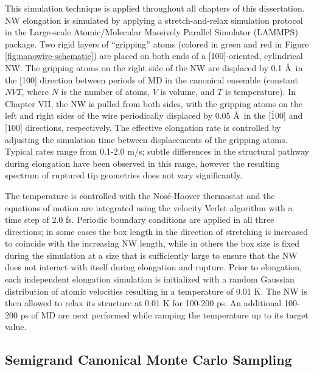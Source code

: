\documentclass[10pt]{report}  %
\newcommand\findent{\hspace*{\parindent}}
\begin{document}
\findent This simulation technique is applied throughout all chapters of this dissertation. NW elongation is simulated by applying a stretch-and-relax simulation protocol \cite{Pu_JCP:2007,Pu:2007,Pu:2008,Pu:2010} in the Large-scale Atomic/Molecular Massively Parallel Simulator (LAMMPS) \cite{Plimpton:1995} package. Two rigid layers of ``gripping'' atoms (colored in green and red in Figure \ref{fig:nanowire-schematic}) are placed on both ends of a [100]-oriented, cylindrical NW. The gripping atoms on the right side of the NW are displaced by 0.1 \AA\ in the [100] direction between periods of MD in the canonical ensemble (constant $NVT$, where $N$ is the number of atoms, $V$ is volume, and $T$ is temperature). In Chapter VII, the NW is pulled from both sides, with the gripping atoms on the left and right sides of the wire periodically displaced by 0.05 \AA\ in the [$\bar{1}$00] and [100] directions, respectively. The effective elongation rate is controlled by adjusting the simulation time between displacements of the gripping atoms. Typical rates range from 0.1-2.0 m/s; subtle differences in the structural pathway during elongation have been observed in this range, however the resulting spectrum of ruptured tip geometries does not vary significantly. \cite{Iacovella_scidac:2011}



The temperature is controlled with the Nos\'{e}-Hoover thermostat \cite{Hoover:1985,Nose:1984} and the equations of motion are integrated using the velocity Verlet algorithm with a time step of 2.0 fs. Periodic boundary conditions are applied in all three directions; in some cases the box length in the direction of stretching is increased to coincide with the increasing NW length, while in others the box size is fixed during the simulation at a size that is sufficiently large to ensure that the NW does not interact with itself during elongation and rupture. Prior to elongation, each independent elongation simulation is initialized with a random Gaussian distribution of atomic velocities resulting in a temperature of 0.01 K. The NW is then allowed to relax its structure at 0.01 K for 100-200 ps. An additional 100-200 ps of MD are next performed while ramping the temperature up to its target value.

\subsection{Semigrand Canonical Monte Carlo Sampling}
\end{document}
